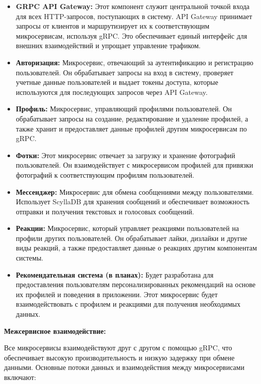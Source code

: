 \begin{itemize}
    \item \textbf{GRPC API Gateway:} Этот компонент служит центральной точкой входа для всех HTTP-запросов, поступающих в систему. API Gateway принимает запросы от клиентов и маршрутизирует их к соответствующим микросервисам, используя gRPC. Это обеспечивает единый интерфейс для внешних взаимодействий и упрощает управление трафиком.
    
    \item \textbf{Авторизация:} Микросервис, отвечающий за аутентификацию и регистрацию пользователей. Он обрабатывает запросы на вход в систему, проверяет учетные данные пользователей и выдает токены доступа, которые используются для последующих запросов через API Gateway.
    
    \item \textbf{Профиль:} Микросервис, управляющий профилями пользователей. Он обрабатывает запросы на создание, редактирование и удаление профилей, а также хранит и предоставляет данные профилей другим микросервисам по gRPC.
    
    \item \textbf{Фотки:} Этот микросервис отвечает за загрузку и хранение фотографий пользователей. Он взаимодействует с микросервисом профилей для привязки фотографий к соответствующим профилям пользователей.
    
    \item \textbf{Мессенджер:} Микросервис для обмена сообщениями между пользователями. Использует ScyllaDB для хранения сообщений и обеспечивает возможность отправки и получения текстовых и голосовых сообщений.
    
    \item \textbf{Реакции:} Микросервис, который управляет реакциями пользователей на профили других пользователей. Он обрабатывает лайки, дизлайки и другие виды реакций, а также предоставляет данные о реакциях другим компонентам системы.
    
    \item \textbf{Рекомендательная система (в планах):} Будет разработана для предоставления пользователям персонализированных рекомендаций на основе их профилей и поведения в приложении. Этот микросервис будет взаимодействовать с профилем и реакциями для получения необходимых данных.
\end{itemize}

\textbf{Межсервисное взаимодействие:}

Все микросервисы взаимодействуют друг с другом с помощью gRPC, что обеспечивает высокую производительность и низкую задержку при обмене данными. Основные потоки данных и взаимодействия между микросервисами включают:

